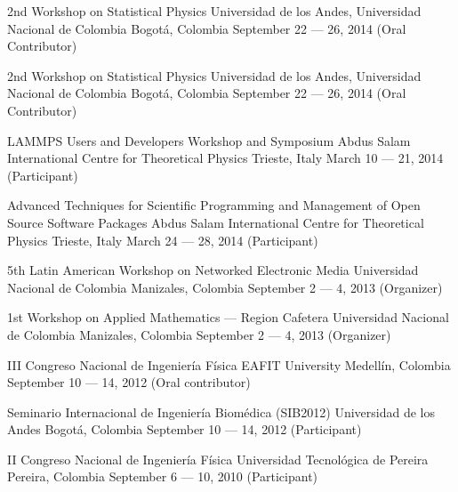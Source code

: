 \documentclass[12pt,english]{moderncv}
\begin{document}
        {2nd Workshop on Statistical Physics}
        {Universidad de los Andes, Universidad Nacional de Colombia}
        {Bogotá, Colombia}
        {September 22 --- 26, 2014}
        {(Oral Contributor)}

        {2nd Workshop on Statistical Physics}
        {Universidad de los Andes, Universidad Nacional de Colombia}
        {Bogotá, Colombia}
        {September 22 --- 26, 2014}
        {(Oral Contributor)}

        {LAMMPS Users and Developers Workshop and Symposium}
        {Abdus Salam International Centre for Theoretical Physics}
        {Trieste, Italy}
        {March 10 --- 21, 2014}
        {(Participant)}

        {%
            Advanced Techniques for Scientific Programming and Management
            of Open Source Software Packages
        }
        {Abdus Salam International Centre for Theoretical Physics}
        {Trieste, Italy}
        {March 24 --- 28, 2014}
        {(Participant)}

        {5th Latin American Workshop on Networked Electronic Media}
        {Universidad Nacional de Colombia}
        {Manizales, Colombia}
        {September 2 --- 4, 2013}
        {(Organizer)}


        {1st Workshop on Applied Mathematics --- Region Cafetera}
        {Universidad Nacional de Colombia}
        {Manizales, Colombia}
        {September 2 --- 4, 2013}
        {(Organizer)}

        {III Congreso Nacional de Ingeniería Física}
        {EAFIT University}
        {Medellín, Colombia}
        {September 10 --- 14, 2012}
        {(Oral contributor)}

        {Seminario Internacional de Ingeniería Biomédica (SIB2012)}
        {Universidad de los Andes}
        {Bogotá, Colombia}
        {September 10 --- 14, 2012}
        {(Participant)}

        {II Congreso Nacional de Ingeniería Física}
        {Universidad Tecnol\'ogica de Pereira}
        {Pereira, Colombia}
        {September 6 --- 10, 2010}
        {(Participant)}
\end{document}
